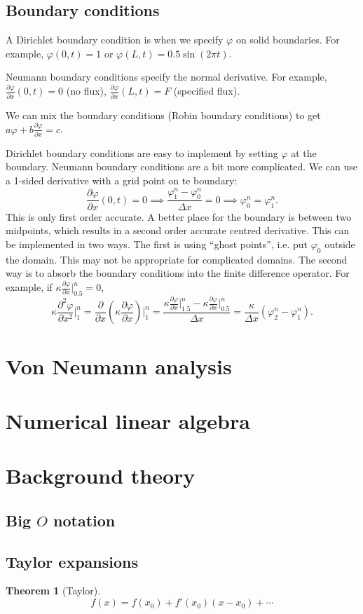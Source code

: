\documentclass[11pt, a4paper]{article}
\renewcommand{\phi}{\varphi}
\theoremstyle{break}
\newtheorem{thm}{Theorem}[section]
\newcommand*{\Paren}[1]{\left(#1\right)}%
\newcommand{\dx}{\Delta x}
\newcommand{\der}[2]{\frac{\partial #1}{\partial #2}}
\newcommand{\pder}[3][2]{\frac{\partial^#1 #2}{\partial #3^#1}}
\newcommand{\eval}[1]{\big\rvert_{#1}}
\newcommand{\Eval}[1]{\bigg\rvert_{#1}}
\begin{document}
\subsection{Boundary conditions}
A Dirichlet boundary condition is when we specify $\phi$ on solid boundaries. For example, $\phi(0,t)=1$ or $\phi(L,t)=0.5\sin(2\pi t)$.

Neumann boundary conditions specify the normal derivative. For example, $\der\phi x(0,t)=0$ (no flux), $\der\phi x(L,t)=F$ (specified flux).

We can mix the boundary conditions (Robin boundary conditions) to get $a\phi+b\der\phi x=c$.

Dirichlet boundary conditions are easy to implement by setting $\phi$ at the boundary. Neumann boundary conditions are a bit more complicated. We can use a 1-sided derivative with a grid point on te boundary: \[\der\phi x(0,t)=0\implies \frac{\phi_1^n-\phi_0^n}{\dx}=0\implies \phi_0^n=\phi_1^n.\] This is only first order accurate. A better place for the boundary is between two midpoints, which results in a second order accurate centred derivative. This can be implemented in two ways. The first is using ``ghost points'', i.e. put $\phi_0$ outside the domain. This may not be appropriate for complicated domains. The second way is to absorb the boundary conditions into the finite difference operator. For example, if $\kappa \der\phi x\eval{0.5}^n=0$, \[\kappa \pder\phi x\Eval1^n=\der{}x\Paren{\kappa\der\phi x}\Eval 1^n=\frac{\kappa\der\phi x\eval{1.5}^n-\kappa \der\phi x\eval{0.5}^n}{\dx}=\frac{\kappa}{\dx}(\phi_2^n-\phi_1^n).\]


\section{Von Neumann analysis}


\section{Numerical linear algebra}\label{sec:numla}


\appendix
\section{Background theory}
\subsection{\texorpdfstring{Big $O$}{Big O} notation}\label{sec:bigO}
\subsection{Taylor expansions}\label{sec:taylor}
\begin{thm}[Taylor]\label{thm:taylor}
	\[f(x)=f(x_0)+f'(x_0)(x-x_0) + \cdots\]
\end{thm}

\nocite{*}



\label{lastpage}
\end{document}
